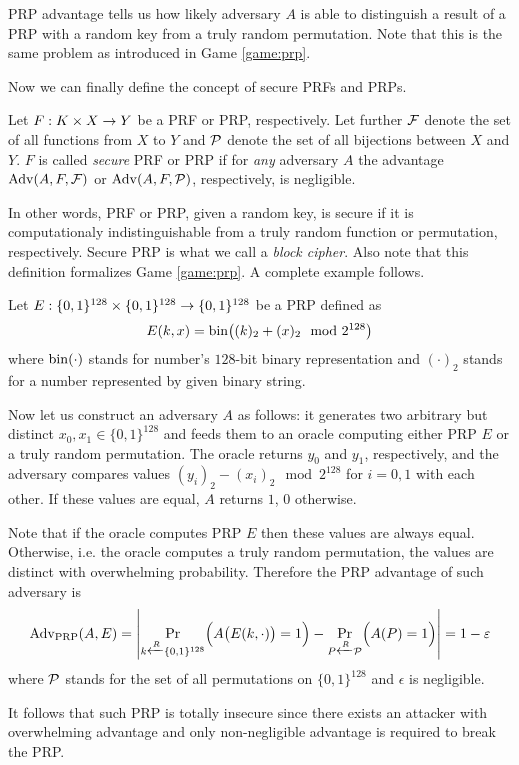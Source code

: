 PRP advantage tells us how likely adversary $A$ is able to distinguish a result of a PRP with a random key from a truly random permutation. Note that this is the same problem as introduced in Game \ref{game:prp}.   %

Now we can finally define the concept of secure PRFs and PRPs.

\begin{defn}
\label{def:secprf}\label{def:secprp}
	Let $F: K\times X\rightarrow Y$ be a PRF or PRP, respectively. Let further $\cal F$ denote the set of all functions from $X$ to $Y$ and $\cal P$ denote the set of all bijections between $X$ and $Y$. $F$ is called {\em secure} PRF or PRP if for {\em any} adversary $A$ the advantage $\operatorname*{Adv}(A,F,{\cal F})$ or $\operatorname*{Adv}(A,F,{\cal P})$, respectively, is negligible.   %
\end{defn}

In other words, PRF or PRP, given a random key, is secure if it is computationaly indistinguishable from a truly random function or permutation, respectively. Secure PRP is what we call a {\em block cipher}. Also note that this definition formalizes Game \ref{game:prp}. A complete example follows.

\begin{example}
	Let $E:\{0,1\}^{128}\times\{0,1\}^{128}\rightarrow\{0,1\}^{128}$ be a PRP defined as
	\[
		E(k,x) = \operatorname*{bin}\bigl((k)_2 + (x)_2 \mod{2^{128}}\bigr)
	\]
	where $\operatorname*{bin}(\cdot)$ stands for number's $128$-bit binary representation and $(\cdot)_2$ stands for a number represented by given binary string.
	
	Now let us construct an adversary $A$ as follows: it generates two arbitrary but distinct $x_0,x_1\in\{0,1\}^{128}$ and feeds them to an oracle computing either PRP $E$ or a truly random permutation. The oracle returns $y_0$ and $y_1$, respectively, and the adversary compares values $(y_i)_2 - (x_i)_2 \mod{2^{128}}$ for $i=0,1$ with each other. If these values are equal, $A$ returns $1$, $0$ otherwise.
	
	Note that if the oracle computes PRP $E$ then these values are always equal. Otherwise, i.e. the oracle computes a truly random permutation, the values are distinct with overwhelming probability. Therefore the PRP advantage of such adversary is
	\[
		\operatorname*{Adv_{PRP}}(A,E) = \left| \Pr\limits_{k\xleftarrow{R} \{0,1\}^{128}}\Bigl(A\bigl(E(k,\cdot)\bigr)=1\Bigr) - \Pr\limits_{P\xleftarrow{R} {\cal P}}\Bigl(A(P)=1\Bigr) \right| = 1 - \varepsilon
	\]
	where $\cal P$ stands for the set of all permutations on $\{0,1\}^{128}$ and $\epsilon$ is negligible.
	
	It follows that such PRP is totally insecure since there exists an attacker with overwhelming advantage and only non-negligible advantage is required to break the PRP.
\end{example}

